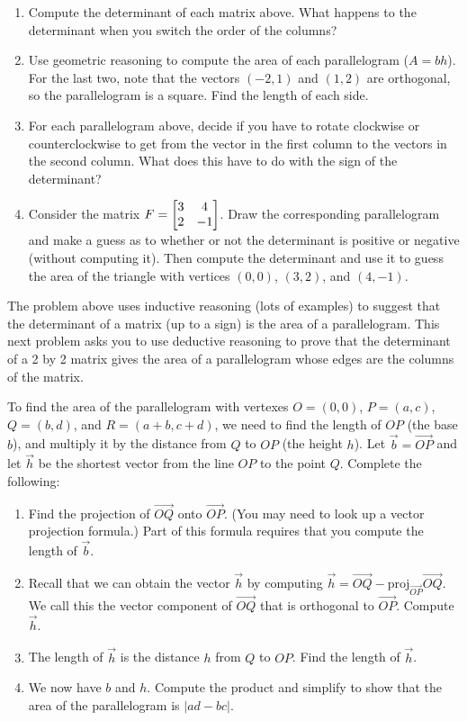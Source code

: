 \begin{problem}
\begin{enumerate}
\item Compute the determinant of each matrix above. What happens to the determinant when you switch the order of the columns? 
\item Use geometric reasoning to compute the area of each parallelogram ($A=bh$). For the last two, note that the vectors $(-2,1)$ and $(1,2)$ are orthogonal, so the parallelogram is a square. Find the length of each side. 
\item For each parallelogram above, decide if you have to rotate clockwise or counterclockwise to get from the vector in the first column to the vectors in the second column. What does this have to do with the sign of the determinant?
\item Consider the matrix $F=\begin{bmatrix}  \begin{matrix} 3\\2 \end{matrix}&\begin{matrix} 4\\-1 \end{matrix}  \end{bmatrix}$.  Draw the corresponding parallelogram and make a guess as to whether or not the determinant is positive or negative (without computing it). Then compute the determinant and use it to guess the area of the triangle with vertices $(0,0)$, $(3,2)$, and $(4,-1)$.
\end{enumerate}
\end{problem}

The problem above uses inductive reasoning (lots of examples) to suggest that the determinant of a matrix (up to a sign) is the area of a parallelogram. This next problem asks you to use deductive reasoning to prove that the determinant of a 2 by 2 matrix gives the area of a parallelogram whose edges are the columns of the matrix.
\begin{problem}
 To find the area of the parallelogram with vertexes $O=(0,0)$, $P=(a,c)$, $Q=(b,d)$, and $R=(a+b,c+d)$, we need to find the length of $OP$ (the base $b$), and multiply it by the distance from $Q$ to $OP$ (the height $h$). Let $\vec b = \vec{OP}$ and let $\vec h$ be the shortest vector from the line $OP$ to the point $Q$. Complete the following:
\begin{enumerate}
 \item Find the projection of $\vec {OQ}$ onto $\vec {OP}$. (You may need to look up a vector projection formula.) Part of this formula requires that you compute the length of $\vec b$.  
 \item Recall that we can obtain the vector $\vec h$ by computing $\vec h = \vec {OQ}-\text{proj}_{\vec{OP}}\vec{OQ}$. We call this the vector component of $\vec {OQ}$ that is orthogonal to $\vec {OP}$. Compute $\vec h$.
 \item The length of $\vec h$ is the distance $h$ from $Q$ to $OP$. Find the length of $\vec h$.
 \item We now have $b$ and $h$. Compute the product and simplify to show that the area of the parallelogram is $|ad-bc|$.
\end{enumerate}
\end{problem}

